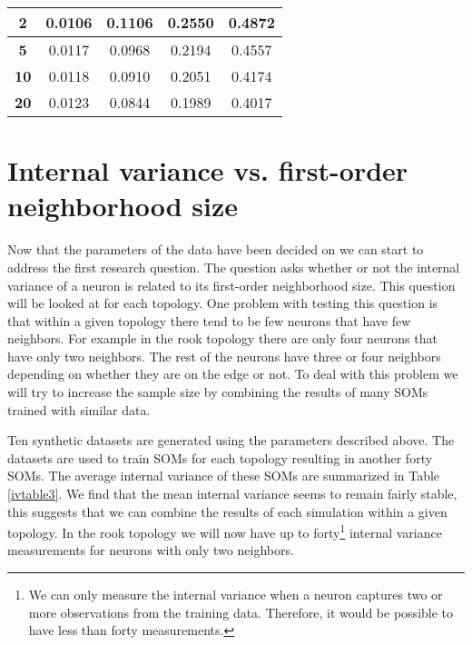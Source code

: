 \begin{table}
{\begin{tabular}{|c||c|c|c|c|}
  \hline
  \textbf{2} & 0.0106& 0.1106& 0.2550& 0.4872 \\
  \hline
  \textbf{5} & 0.0117& 0.0968& 0.2194& 0.4557 \\
  \hline
  \textbf{10} & 0.0118& 0.0910& 0.2051& 0.4174 \\
  \hline
  \textbf{20} & 0.0123& 0.0844& 0.1989& 0.4017 \\
  \hline
  \end{tabular} 
  \label{ivtable1:graph}
} 
\end{table}

\section{Internal variance vs. first-order neighborhood size}
Now that the parameters of the data have been decided on we can start to
address the first research question. The question asks whether or not the
internal variance of a neuron is related to its first-order neighborhood size.
This question will be looked at for each topology.  One problem with testing
this question is that within a given topology there tend to be few neurons
that have few neighbors.  For example in the rook topology there are only four
neurons that have only two neighbors. The rest of the neurons have three or
four neighbors depending on whether they are on the edge or not. To deal with
this problem we will try to increase the sample size by combining the results
of many SOMs trained with similar data.

Ten synthetic datasets are generated using the parameters described above. The
datasets are used to train SOMs for each topology resulting in another forty
SOMs. The average internal variance of these SOMs are summarized in Table
\ref{ivtable3}.  We find that the mean internal variance seems to remain
fairly stable, this suggests that we can combine the results of each
simulation within a given topology. In the rook topology we will now have up
to forty\footnote{We can only measure the internal variance when a neuron
captures two or more observations from the training data. Therefore, it would
be possible to have less than forty measurements.} internal variance
measurements for neurons with only two neighbors.


